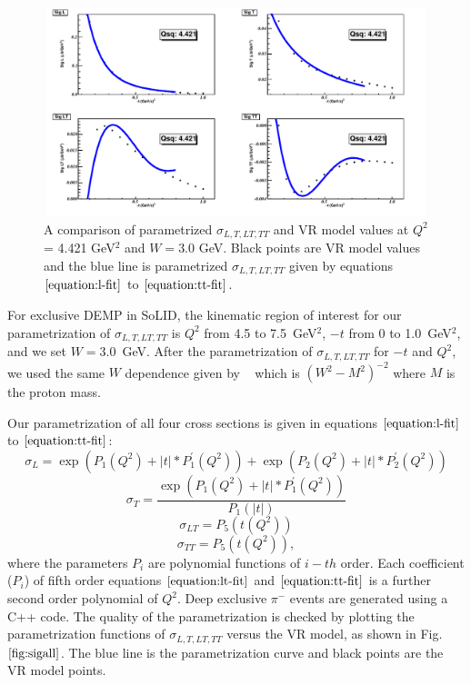 \begin{figure}[!hbt]
    \centering
    \includegraphics[width=6.0in,height=2.4in]{./figures/pimFit.pdf}
    \caption{ A comparison of parametrized $\sigma_{L,T,LT,TT}$ and VR model
values at $Q^2$ = 4.421 GeV$^2$ and $W = 3.0$ GeV.  Black points are VR model
values and the blue line is parametrized $\sigma_{L,T,LT,TT}$ given by
equations $\ref{equation:l-fit}$ to $\ref{equation:tt-fit}$. }
    \label{fig:sigall}
\end{figure}

For exclusive DEMP in SoLID, the kinematic region of interest for our
parametrization of $\sigma_{L,T,LT,TT}$ is $Q^2$ from 4.5 to 7.5~GeV$^2$, $-t$
from 0 to 1.0~GeV$^2$, and we set $W=3.0$~GeV. After the parametrization of
$\sigma_{L,T,LT,TT}$ for $-t$ and $Q^2$, we used the same $W$ dependence given
by ~\cite{gmhuber} which is $(W^2-M^2)^{-2}$ where $M$ is the proton mass.

Our parametrization of all four cross sections is given in equations
$\ref{equation:l-fit}$ to $\ref{equation:tt-fit}$:
\begin{equation}
        \sigma_{L} = \exp{(P_1(Q^2) + |t| * P^{\prime}_1(Q^2))} +
\exp{(P_2(Q^2) + |t| * P^{\prime}_2(Q^2))}
     \label{equation:l-fit}
\end{equation}
\begin{equation}
        \sigma_{T} =  \frac{\exp{(P_1(Q^2) + |t| * P^{\prime}_1(Q^2))}}{P_{1}(|t|)}
     \label{equation:t-fit}
\end{equation}
\begin{equation}
        \sigma_{LT} = P_{5}(t(Q^2))
     \label{equation:lt-fit}
\end{equation}
\begin{equation}
        \sigma_{TT} = P_{5}(t(Q^2)),        
     \label{equation:tt-fit}
\end{equation}
where the parameters $P_{i}$ are polynomial functions of $i-th$ order. Each
coefficient ($P_{i}$) of fifth order equations $\ref{equation:lt-fit}$ and
$\ref{equation:tt-fit}$ is a further second order polynomial of $Q^2$. Deep
exclusive $\pi^{-}$ events are generated using a C++ code. The quality of
the parametrization is checked by plotting the parametrization functions of
$\sigma_{L,T,LT,TT}$ versus the VR model, as shown in Fig. $\ref{fig:sigall}$.
The blue line is the parametrization curve and black points are the VR model
points.

